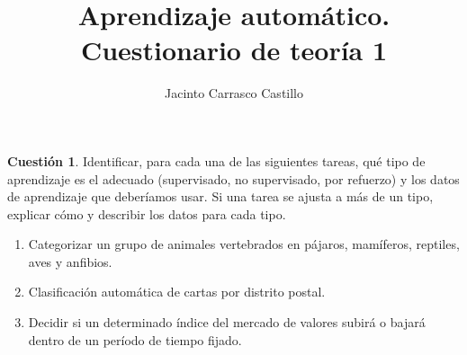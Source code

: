 \documentclass[11pt,leqno]{article}
\title{Aprendizaje autom\'atico. Cuestionario de teor\'ia 1}
\author{Jacinto Carrasco Castillo}
\theoremstyle{definition}
\begin{document}
\maketitle

\newtheorem{cuestion}{Cuestión}
\newtheorem{solucion}{Solución}
\newtheorem{cuestionopcional}{Cuestión Opcional}


\begin{cuestion}
Identificar, para cada una de las siguientes tareas, qué tipo de aprendizaje es el adecuado (supervisado, no supervisado, por refuerzo) y los datos de aprendizaje que deberíamos usar. Si una tarea se ajusta a más de un tipo, explicar cómo y describir los datos para cada tipo.

\begin{enumerate}[a]
\item Categorizar un grupo de animales vertebrados en pájaros, mamíferos, reptiles, aves y anfibios.
\item Clasificación automática de cartas por distrito postal.
\item Decidir si un determinado índice del mercado de valores subirá o bajará dentro de un período de tiempo fijado.
\end{enumerate}
\end{cuestion}
\end{document}
